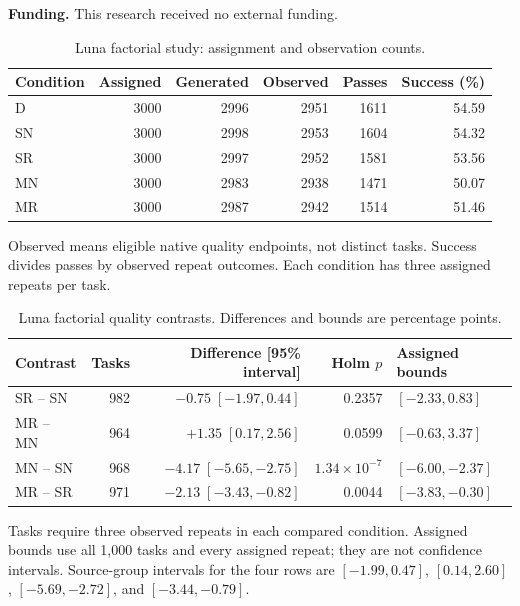 \documentclass[pdflatex,sn-nature]{scientificreports}
\begin{document}
\textbf{Funding.} This research received no external funding.
\clearpage
\begin{table}[p]\centering
\caption{Luna factorial study: assignment and observation counts.}
\label{tab:scale-quality}
\begin{tabular}{lrrrrr}\toprule
Condition & Assigned & Generated & Observed & Passes & Success (\%)\\\midrule
D & 3000 & 2996 & 2951 & 1611 & 54.59\\
SN & 3000 & 2998 & 2953 & 1604 & 54.32\\
SR & 3000 & 2997 & 2952 & 1581 & 53.56\\
MN & 3000 & 2983 & 2938 & 1471 & 50.07\\
MR & 3000 & 2987 & 2942 & 1514 & 51.46\\
\bottomrule\end{tabular}
\par\smallskip\noindent Observed means eligible native quality endpoints, not distinct tasks. Success divides passes by observed repeat outcomes. Each condition has three assigned repeats per task.
\end{table}

\begin{table}[p]\centering
\caption{Luna factorial quality contrasts. Differences and bounds are percentage points.}
\label{tab:scale-contrasts}
\small
\begin{tabular}{@{}lrrrl@{}}\toprule
Contrast & Tasks & Difference [95\% interval] & Holm $p$ & Assigned bounds\\\midrule
SR -- SN & 982 & $-0.75\;[-1.97, 0.44]$ & 0.2357 & $[-2.33, 0.83]$\\
MR -- MN & 964 & $+1.35\;[0.17, 2.56]$ & 0.0599 & $[-0.63, 3.37]$\\
MN -- SN & 968 & $-4.17\;[-5.65,-2.75]$ & $1.34\!\times\!10^{-7}$ & $[-6.00,-2.37]$\\
MR -- SR & 971 & $-2.13\;[-3.43,-0.82]$ & 0.0044 & $[-3.83,-0.30]$\\
\bottomrule\end{tabular}
\par\smallskip\noindent Tasks require three observed repeats in each compared condition. Assigned bounds use all 1,000 tasks and every assigned repeat; they are not confidence intervals. Source-group intervals for the four rows are $[-1.99,0.47]$, $[0.14,2.60]$, $[-5.69,-2.72]$, and $[-3.44,-0.79]$.
\end{table}
\end{document}
